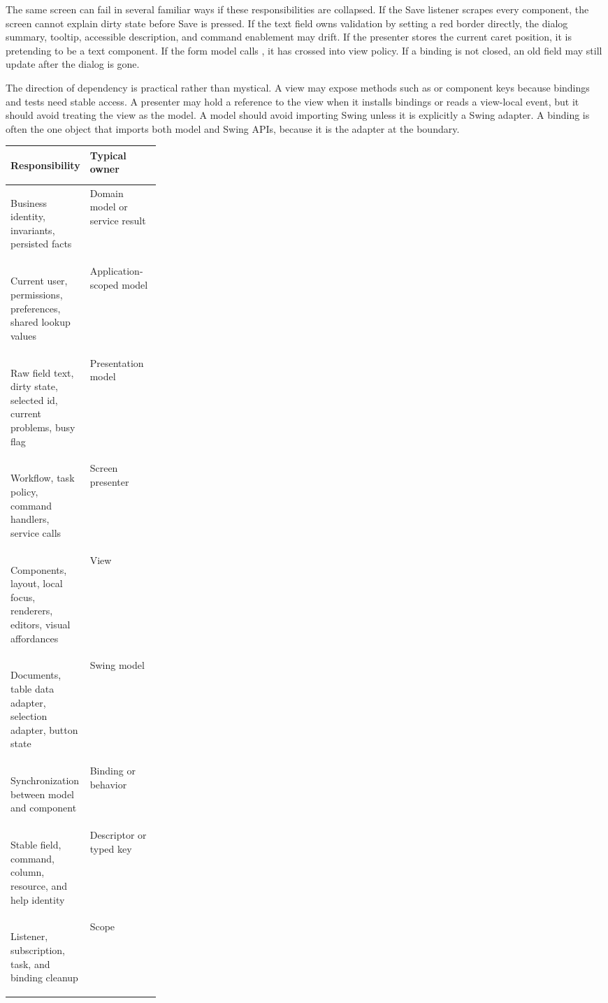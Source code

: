 The same screen can fail in several familiar ways if these responsibilities are collapsed. If the Save listener scrapes every component, the screen cannot explain dirty state before Save is pressed. If the text field owns validation by setting a red border directly, the dialog summary, tooltip, accessible description, and command enablement may drift. If the presenter stores the current caret position, it is pretending to be a text component. If the form model calls , it has crossed into view policy. If a binding is not closed, an old field may still update after the dialog is gone.

The direction of dependency is practical rather than mystical. A view may expose methods such as  or component keys because bindings and tests need stable access. A presenter may hold a reference to the view when it installs bindings or reads a view-local event, but it should avoid treating the view as the model. A model should avoid importing Swing unless it is explicitly a Swing adapter. A binding is often the one object that imports both model and Swing APIs, because it is the adapter at the boundary.

\begin{center}\small
\begin{tabularx}{0.96\linewidth}{>{\bfseries\raggedright\arraybackslash}p{0.25\linewidth}X}
\toprule
Responsibility & Typical owner\\
\midrule
Business identity, invariants, persisted facts & Domain model or service result\\
Current user, permissions, preferences, shared lookup values & Application-scoped model\\
Raw field text, dirty state, selected id, current problems, busy flag & Presentation model\\
Workflow, task policy, command handlers, service calls & Screen presenter\\
Components, layout, local focus, renderers, editors, visual affordances & View\\
Documents, table data adapter, selection adapter, button state & Swing model\\
Synchronization between model and component & Binding or behavior\\
Stable field, command, column, resource, and help identity & Descriptor or typed key\\
Listener, subscription, task, and binding cleanup & Scope\\
\bottomrule
\end{tabularx}
\end{center}


